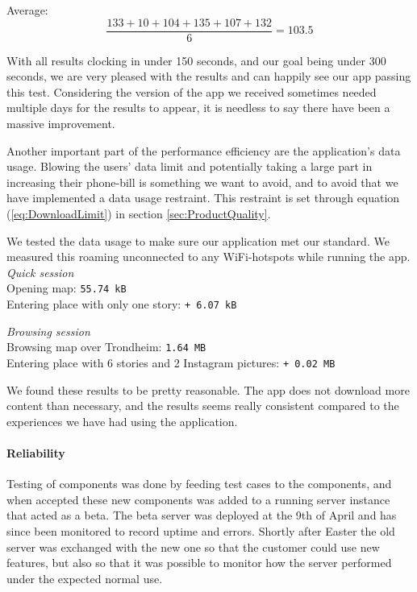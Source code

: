 Average: 
\begin{equation}
\frac{133 + 10 + 104 + 135 + 107 + 132}{6} = {103.5}
\end{equation}

With all results clocking in under 150 seconds, and our goal being under 300 seconds, we are very pleased with the results and can happily see our app passing this test. Considering the version of the app we received sometimes needed multiple days for the results to appear, it is needless to say there have been a massive improvement.


Another important part of the performance efficiency are the application's data usage. Blowing the users' data limit and potentially taking a large part in increasing their phone-bill is something we want to avoid, and to avoid that we have implemented a data usage restraint. This restraint is set through equation (\ref{eq:DownloadLimit}) in section \ref{sec:ProductQuality}.

We tested the data usage to make sure our application met our standard. We measured this roaming unconnected to any WiFi-hotspots while running the app.\\

\emph{Quick session}\\
Opening map: \texttt{55.74 kB}\\
Entering place with only one story: \texttt{+ 6.07 kB}

\emph{Browsing session}\\
Browsing map over Trondheim: \texttt{1.64 MB}\\
Entering place with 6 stories and 2 Instagram pictures: \texttt{+ 0.02 MB}

We found these results to be pretty reasonable. The app does not download more content than necessary, and the results seems really consistent compared to the experiences we have had using the application.

\paragraph{Reliability}

Testing of components was done by feeding test cases to the components, and when accepted these new components was added to a running server instance that acted as a beta. The beta server was deployed at the 9th of April and has since been monitored to record uptime and errors. Shortly after Easter the old server was exchanged with the new one so that the customer could use new features, but also so that it was possible to monitor how the server performed under the expected normal use.

